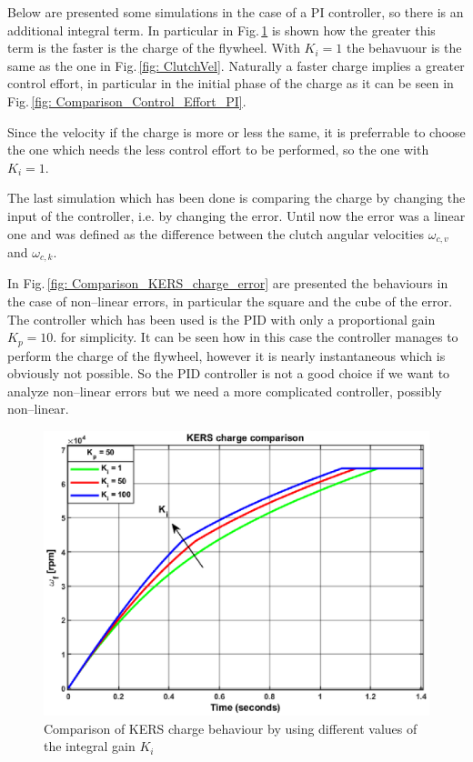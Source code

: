 \documentclass[11pt]{article}
\begin{document}
Below are presented some simulations in the case of a PI controller, so there is an additional integral term. In particular in Fig.\,\ref{fig: Comparison_KERS_Charge_PI} is shown how the greater this term is the faster is the charge of the flywheel. With $K_i = 1$ the behavuour is the same as the one in Fig.\,\ref{fig: ClutchVel}. Naturally a faster charge implies a greater control effort, in particular in the initial phase of the charge as it can be seen in Fig.\,\ref{fig: Comparison_Control_Effort_PI}. 

Since the velocity if the charge is more or less the same, it is preferrable to choose the one which needs the less control effort to be performed, so the one with $K_i = 1$.

The last simulation which has been done is comparing the charge by changing the input of the controller, i.e. by changing the error. Until now the error was a linear one and was defined as the difference between the clutch angular velocities $\omega_{c,v}$ and $\omega_{c,k}$. 

In Fig.\,\ref{fig: Comparison_KERS_charge_error} are presented the behaviours in the case of non--linear errors, in particular the square and the cube of the error. The controller which has been used is the PID with only a proportional gain $K_p = 10$. for simplicity. It can be seen how in this case the controller manages to perform the charge of the flywheel, however it is nearly instantaneous which is obviously not possible. So the PID controller is not a good choice if we want to analyze non--linear errors but we need a more complicated controller, possibly non--linear.

\begin{figure}[H]
\centering
\includegraphics[width=.6\textwidth]{Images/Results_Dynamics/Charge_comparison/kers_charge_comp_IntGain.eps}
\caption{Comparison of KERS charge behaviour by using different values of the integral gain $K_i$}
\label{fig: Comparison_KERS_Charge_PI}
\end{figure}
\end{document}

